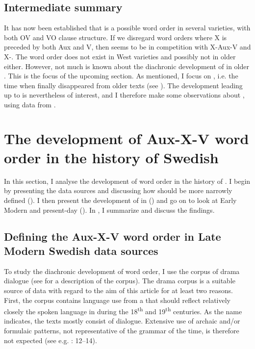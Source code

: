 \documentclass[output=paper, colorlinks, citecolor=brown]{langscibook}
\begin{document}
\subsection{Intermediate summary}\label{sec:sangfelt:3.4}

It has now been established that  is a possible word order in several  varieties, with both OV and VO clause structure. If we disregard word orders where X is preceded by both Aux and V, then  seems to be in competition with X-Aux-V and X-. The word order  does not exist in West  varieties and possibly not in older  either. However, not much is known about the diachronic development of  in older . This is the focus of the upcoming section. As mentioned, I focus on , i.e. the time when  finally disappeared from older  texts (see \citealt{Platzack1983,Petzell2011,Sangfelt2019}). The development leading up to  is nevertheless of interest, and I therefore make some observations about , using data from \citet{Sangfelt2019}.

\section{The development of Aux-X-V word order in the history of Swedish}\label{sec:sangfelt:4}

In this section, I analyse the development of  word order in the history of . I begin by presenting the data sources and discussing how  should be more narrowly defined (). I then present the development of  in  () and go on to look at Early Modern and present-day  (). In , I summarize and discuss the findings.

\subsection{Defining the Aux-X-V word order in Late Modern Swedish data sources}\label{sec:sangfelt:4.1}

To study the diachronic development of  word order, I use the corpus of  drama dialogue (see \citealt{MarttalaStromquist2001} for a description of the corpus). The drama corpus is a suitable source of data with regard to the aim of this article for at least two reasons. First, the corpus contains language use from a  that should reflect relatively closely the spoken language in  during the 18\textsuperscript{th} and 19\textsuperscript{th} centuries. As the name indicates, the texts mostly consist of dialogue. Extensive use of archaic and/or formulaic patterns, not representative of the grammar of the time, is therefore not expected (see e.g. \citealt{Fischer2007}: 12–14).
\end{document}
